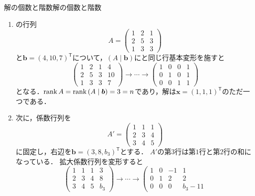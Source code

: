 \begin{example}{解の個数と階数}{解の個数と階数}
  \begin{enumerate}[label=(\arabic*),leftmargin=2.4em]
    \item {}の行列
      \[
        A = \begin{pmatrix} 1 & 2 & 1 \\ 2 & 5 & 3 \\ 1 & 3 & 3 \end{pmatrix}
      \]
      と$\bm{b} = (4, 10, 7)^\mathsf{T}$について，$(A \mid \bm{b})$にと同じ行基本変形を施すと
      \[
        \left(
        \begin{array}{ccc|c}
          1 & 2 & 1 & 4 \\
          2 & 5 & 3 & 10 \\
          1 & 3 & 3 & 7
        \end{array}
        \right)
        \longrightarrow \cdots \longrightarrow
        \left(
        \begin{array}{ccc|c}
          1 & 0 & 0 & 1 \\
          0 & 1 & 0 & 1 \\
          0 & 0 & 1 & 1
        \end{array}
        \right)
      \]
      となる．$\operatorname{rank} A = \operatorname{rank}\,(A \mid \bm{b}) = 3 = n$であり，解は$\bm{x} = (1, 1, 1)^\mathsf{T}$のただ一つである．
    \item 次に，係数行列を
      \[
        A' = \begin{pmatrix} 1 & 1 & 1 \\ 2 & 3 & 4 \\ 3 & 4 & 5 \end{pmatrix}
      \]
      に固定し，右辺を$\bm{b} = (3, 8, b_3)^\mathsf{T}$とする．
      $A'$の第$3$行は第$1$行と第$2$行の和になっている．
      拡大係数行列を変形すると
      \[
        \left(
        \begin{array}{ccc|c}
          1 & 1 & 1 & 3 \\
          2 & 3 & 4 & 8 \\
          3 & 4 & 5 & b_3
        \end{array}
        \right)
        \longrightarrow \cdots \longrightarrow
        \left(
        \begin{array}{ccc|c}
          1 & 0 & -1 & 1 \\
          0 & 1 & 2 & 2 \\
          0 & 0 & 0 & b_3 - 11
        \end{array}
\]
\end{enumerate}
\end{example}
